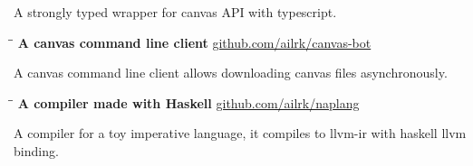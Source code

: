 \documentclass{res}
\begin{document}
\begin{resume}
\begin{tabbing}
    \end{tabbing}\vspace{-30pt}
    A strongly typed wrapper for canvas API with typescript.

    \vspace{-0.2in}
    \begin{tabbing}
        \hspace{2.4in}\= \hspace{0.9in}\= \kill
        {\bf A canvas command line client} \>               \>\url{github.com/ailrk/canvas-bot}\\

    \end{tabbing}\vspace{-30pt}
    A canvas command line client allows downloading canvas files asynchronously.

    \vspace{-0.2in}
    \begin{tabbing}
        \hspace{2.4in}\= \hspace{0.9in}\= \kill
        {\bf A compiler made with Haskell} \>               \>\url{github.com/ailrk/naplang}\\

    \end{tabbing}\vspace{-30pt}
    A compiler for a toy imperative language, it compiles to llvm-ir with haskell llvm binding.



\end{resume}
\end{document}
